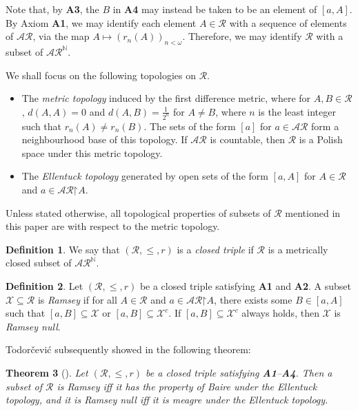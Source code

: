 \documentclass[10pt,a4paper]{amsart}
\theoremstyle{plain}
\numberwithin{equation}{section}
\newtheorem{theorem}{Theorem}[section]
\theoremstyle{definition}
\newtheorem{definition}[theorem]{Definition}
\newcommand{\N}{\mathbb{N}}
\newcommand{\cal}{\mathcal}
\newcommand{\restrictedto}{\mathord{\upharpoonright}}
\newcommand{\X}{\cal{X}}
\begin{document}
Note that, by \textbf{A3}, the $B$ in \textbf{A4} may instead be taken to be an element of $[a,A]$. By Axiom \textbf{A1}, we may identify each element $A \in \cal{R}$ with a sequence of elements of $\cal{AR}$, via the map $A \mapsto (r_n(A))_{n<\omega}$. Therefore, we may identify $\cal{R}$ with a subset of $\cal{AR}^\N$.

We shall focus on the following topologies on $\cal{R}$.
\begin{itemize}
    \item The \emph{metric topology} induced by the first difference metric, where for $A,B \in \cal{R}$, $d(A,A) = 0$ and $d(A,B) = \frac{1}{2^n}$ for $A \neq B$, where $n$ is the least integer such that $r_n(A) \neq r_n(B)$. The sets of the form $[a]$ for $a \in \cal{AR}$ form a neighbourhood base of this topology. If $\cal{AR}$ is countable, then $\cal{R}$ is a Polish space under this metric topology.

    \item The \emph{Ellentuck topology} generated by open sets of the form $[a,A]$ for $A \in \cal{R}$ and $a \in \cal{AR}\restrictedto A$.
\end{itemize}
Unless stated otherwise, all topological properties of subsets of $\cal{R}$ mentioned in this paper are with respect to the metric topology.

\begin{definition}
    We say that $(\cal{R},\leq,r)$ is a \emph{closed triple} if $\cal{R}$ is a metrically closed subset of $\cal{AR}^\N$.
\end{definition}

\begin{definition}
    Let $(\cal{R},\leq,r)$ be a closed triple satisfying \textbf{A1} and \textbf{A2}. A subset $\X \subseteq \cal{R}$ is \emph{Ramsey} if for all $A \in \cal{R}$ and $a \in \cal{AR}\restrictedto A$, there exists some $B \in [a,A]$ such that $[a,B] \subseteq \X$ or $[a,B] \subseteq \X^c$. If $[a,B] \subseteq \X^c$ always holds, then $\X$ is \emph{Ramsey null}.
\end{definition}

Todor\v{c}evi\'{c} subsequently showed in \cite{T10} the following theorem:

\begin{theorem}[{\cite[Abstract Ellentuck theorem]{T10}}]
\label{thm:abstract.Ellentuck.thm}
    Let $(\cal{R},\leq,r)$ be a closed triple satisfying \textbf{A1}--\textbf{A4}. Then a subset of $\cal{R}$ is Ramsey iff it has the property of Baire under the Ellentuck topology, and it is Ramsey null iff it is meagre under the Ellentuck topology. 
\end{theorem}
\end{document}
